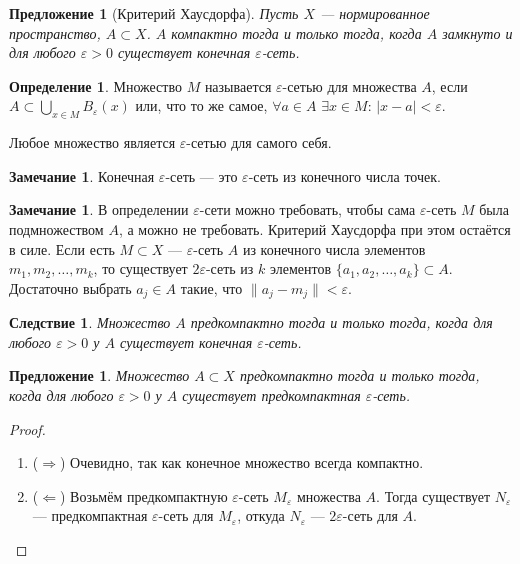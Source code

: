 \documentclass[11pt,openany,a4paper]{scrartcl}
\theoremstyle{plain}
\newtheorem{corollary}[theorem]{Следствие}
\newtheorem{proposition}[theorem]{Предложение}
\theoremstyle{definition}
\newtheorem{definition}[theorem]{Определение}
\newtheorem{remark}[theorem]{Замечание}
\begin{document}
\begin{proposition}[Критерий Хаусдорфа]
    Пусть $X$ — нормированное пространство, $A\subset X$. $A$ компактно тогда и только
    тогда, когда $A$ замкнуто и для любого $\varepsilon > 0$ существует конечная
    $\varepsilon$-сеть.
\end{proposition}
\begin{definition}
    Множество $M$ называется $\varepsilon$-сетью для множества $A$, если
    $A \subset \bigcup\limits_{x \in M}B_\varepsilon(x)$ или, что то же самое,
    $\forall a \in A$ $\exists x\in M$: $|x-a|<\varepsilon$.
\end{definition}
Любое множество является $\varepsilon$-сетью для самого себя.
\begin{remark}
    Конечная $\varepsilon$-сеть — это $\varepsilon$-сеть из конечного числа точек.
\end{remark}
\begin{remark}
    В определении $\varepsilon$-сети можно требовать, чтобы сама $\varepsilon$-сеть $M$ была
    подмножеством $A$, а можно не требовать. Критерий Хаусдорфа при этом остаётся в силе.
    Если есть $M \subset X$ — $\varepsilon$-сеть $A$ из конечного числа элементов
    $m_1, m_2, \ldots, m_k$, то существует $2\varepsilon$-сеть из $k$ элементов
    $\{a_1, a_2,\ldots,a_k\} \subset A$. Достаточно выбрать $a_j \in A$ такие, что
    $\|a_j - m_j\| < \varepsilon$.
\end{remark}

\begin{corollary}
    Множество $A$ предкомпактно тогда и только тогда, когда для любого $\varepsilon > 0$ 
    у $A$ существует конечная $\varepsilon$-сеть.
\end{corollary}

\begin{proposition}
    Множество $A \subset X$ предкомпактно тогда и только тогда, когда для любого
    $\varepsilon > 0$ у $A$ существует предкомпактная
    $\varepsilon$-сеть.
\end{proposition}
\begin{proof}
\mbox{}
    \begin{enumerate}
        \item ($\Rightarrow$) Очевидно, так как конечное множество всегда компактно.
        \item ($\Leftarrow$) Возьмём предкомпактную $\varepsilon$-сеть $M_\varepsilon$ 
        множества $A$. Тогда существует $N_\varepsilon$ — предкомпактная $\varepsilon$-сеть
        для $M_\varepsilon$, откуда $N_\varepsilon$ — $2\varepsilon$-сеть для $A$.
    \end{enumerate}
\end{proof}
\end{document}
